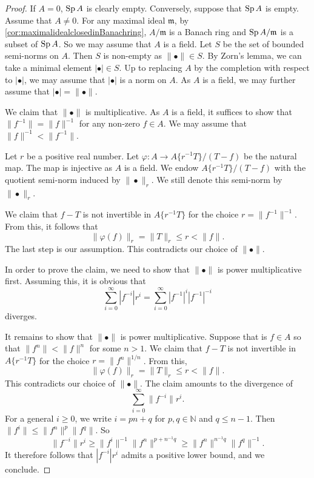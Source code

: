 \begin{proof}
    If $A=0$, $\operatorname{Sp} A$ is clearly empty. Conversely, suppose that $\operatorname{Sp} A$ is empty. Assume that $A\neq 0$. For any maximal ideal $\mathfrak{m}$, by \cref{cor:maximalidealclosedinBanachring}, $A/\mathfrak{m}$ is a Banach ring and $\operatorname{Sp} A/\mathfrak{m}$ is a subset of $\operatorname{Sp} A$. So we may assume that $A$ is a field. Let $S$ be the set of bounded semi-norms on $A$. Then $S$ is non-empty as $\|\bullet\|\in S$. By Zorn's lemma, we can take a minimal element $|\bullet|\in S$. Up to replacing $A$ by the completion with respect to $|\bullet|$, we may assume that $|\bullet |$ is a norm on $A$. As $A$ is a field, we may further assume that $|\bullet|=\|\bullet\|$.
    
    We claim that $\|\bullet\|$ is multiplicative. As $A$ is a field, it suffices to show that $\|f^{-1}\|=\|f\|^{-1}$ for any non-zero $f\in A$. We may assume that $\|f\|^{-1}<\|f^{-1}\|$.
    
    Let $r$ be a positive real number. Let $\varphi:A\rightarrow A\{r^{-1}T\}/(T-f)$ be the natural map. The map is injective as $A$ is a field. We endow $A\{r^{-1}T\}/(T-f)$ with the quotient semi-norm induced by $\|\bullet\|_r$. We still denote this semi-norm by $\|\bullet\|_r$.

    We claim that $f-T$ is not invertible in $A\{r^{-1}T\}$ for the choice $r=\|f^{-1}\|^{-1}$. From this, it follows that 
    \[
        \|\varphi(f)\|_r  =\|T\|_r\leq r <\|f\|.
    \]
    The last step is our assumption. This contradicts our choice of $\|\bullet\|$.
    
    In order to prove the claim, we need to show that $\|\bullet\|$ is power multiplicative first. Assuming this, it is obvious that 
    \[
        \sum_{i=0}^{\infty}|f^{-i}|r^i=\sum_{i=0}^{\infty}|f^{-1}|^{i}|f^{-1}|^{-i}
    \]
    diverges.
    
    It remains to show that $\|\bullet\|$ is power multiplicative.
    Suppose that is $f\in A$ so that $\|f^n\|<\|f\|^n$ for some $n>1$. We claim that $f-T$ is not invertible in $A\{r^{-1}T\}$  for the choice $r=\|f^{n}\|^{1/n}$. From this,
    \[
      \|\varphi(f)\|_r=\|T\|_r\leq r<\|f\|.  
    \]
    This contradicts our choice of $\|\bullet\|$. The claim amounts to the divergence of
    \[
        \sum_{i=0}^{\infty}\|f^{-i}\|r^i.
    \]
    For a general $i\geq 0$, we write $i=pn+q$ for $p,q\in \mathbb{N}$ and $q\leq n-1$. Then $\|f^i\|\leq \|f^n\|^p \|f^q\|$. So 
    \[
        \|f^{-i}\|r^i\geq \|f^i\|^{-1} \|f^n\|^{p+n^{-1}q}\geq \|f^n\|^{n^{-1}q}\|f^q\|^{-1}.  
    \]
    It therefore follows that $|f^{-i}|r^i$ admits a positive lower bound, and we conclude.
\end{proof}


